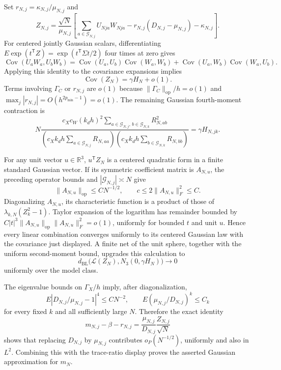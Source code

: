 Set \(r_{N,j}=\kappa_{N,j}/\mu_{N,j}\) and
\[
 Z_{N,j}=\frac{\sqrt N}{\mu_{N,j}}
 \left[\sum_{a\in\mathcal G_{N,j}}U_{Nja}W_{Nja}
       -r_{N,j}(D_{N,j}-\mu_{N,j})-\kappa_{N,j}\right].
\]
For centered jointly Gaussian scalars, differentiating
\(E\exp(t^{\mathsf T}Z)=\exp(t^{\mathsf T}\Sigma t/2)\) four times at zero gives
\[
 \operatorname{Cov}(U_aW_a,U_bW_b)
 =\operatorname{Cov}(U_a,U_b)\operatorname{Cov}(W_a,W_b)
 +\operatorname{Cov}(U_a,W_b)\operatorname{Cov}(W_a,U_b).
\]
Applying this identity to the covariance expansions implies
\[
 \operatorname{Cov}(Z_N)=\gamma H_N+o(1).
\]
Terms involving \(\Gamma_C\) or \(r_{N,j}\) are \(o(1)\) because
\(\|\Gamma_C\|_{\mathrm{op}}/h=o(1)\) and \(\max_j|r_{N,j}|=O(h^{2p_{\min}-1})=o(1)\).  The remaining Gaussian fourth-moment contraction is
\[
 N\frac{c_Xc_W(k_dh)^2
 \sum_{a\in\mathcal G_{N,j},\,b\in\mathcal G_{N,k}}R_{N,ab}^2}
 {(c_Xk_dh\sum_{a\in\mathcal G_{N,j}}R_{N,aa})
  (c_Xk_dh\sum_{b\in\mathcal G_{N,k}}R_{N,bb})}
 =\gamma H_{N,jk}.
\]

For any unit vector \(u\in\mathbb R^3\), \(u^{\mathsf T}Z_N\) is a centered quadratic form in a finite standard Gaussian vector.  If its symmetric coefficient matrix is \(A_{N,u}\), the preceding operator bounds and \(|\mathcal G_{N,j}|\asymp N\) give
\[
 \|A_{N,u}\|_{\mathrm{op}}\le CN^{-1/2},
 \qquad c\le2\|A_{N,u}\|_F^2\le C.
\]
Diagonalizing \(A_{N,u}\), its characteristic function is a product of those of \(\lambda_{k,N}(Z_k^2-1)\).  Taylor expansion of the logarithm has remainder bounded by
\(C|t|^3\|A_{N,u}\|_{\mathrm{op}}\|A_{N,u}\|_F^2=o(1)\), uniformly for bounded \(t\) and unit \(u\).  Hence every linear combination converges uniformly to its centered Gaussian law with the covariance just displayed.  A finite net of the unit sphere, together with the uniform second-moment bound, upgrades this calculation to
\[
 d_{\mathrm{BL}}\bigl(\mathcal L(Z_N),N_3(0,\gamma H_N)\bigr)\longrightarrow0
\]
uniformly over the model class.

The eigenvalue bounds on \(\Gamma_X/h\) imply, after diagonalization,
\[
 E\left|D_{N,j}/\mu_{N,j}-1\right|^4\le CN^{-2},
 \qquad
 E\left(\mu_{N,j}/D_{N,j}\right)^k\le C_k
\]
for every fixed \(k\) and all sufficiently large \(N\).  Therefore the exact identity
\[
 m_{N,j}-\beta-r_{N,j}
 =\frac{\mu_{N,j}}{D_{N,j}}\frac{Z_{N,j}}{\sqrt N}
\]
shows that replacing \(D_{N,j}\) by \(\mu_{N,j}\) contributes \(o_P(N^{-1/2})\), uniformly and also in \(L^2\).  Combining this with the trace-ratio display proves the asserted Gaussian approximation for \(m_N\).

